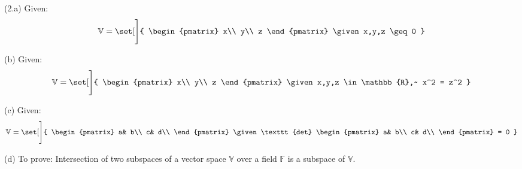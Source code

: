 \documentclass[12pt,letterpaper,fleqn]{article}
\theoremstyle{definition}
\begin{document}
\newpage
(2.a) Given:
	\begin{align*}
	\mathbb{V} = \set[\Bigg]{
	\begin{pmatrix}
	x\\
	y\\
	z
\end{pmatrix}	\given x,y,z \geq 0	
	}
	\end{align*}

 (b) Given:
	\begin{align*}
	\mathbb{V} = \set[\Bigg]{
	\begin{pmatrix}
	x\\
	y\\
	z
\end{pmatrix}	\given x,y,z \in \mathbb{R},~ x^2 = z^2	
	}
	\end{align*}

 (c) Given:
 	\begin{align*}
	\mathbb{V} = \set[\Bigg]{
	\begin{pmatrix}
	a& b\\
	c& d\\
\end{pmatrix}	\given \texttt{det}
	\begin{pmatrix}
	a& b\\
	c& d\\
	\end{pmatrix} = 0
	}
	\end{align*}

 (d) To prove: Intersection of two subspaces of a vector space $\mathbb{V}$ over a field $\mathbb{F}$ is a subspace of $\mathbb{V}$.
\end{document}
